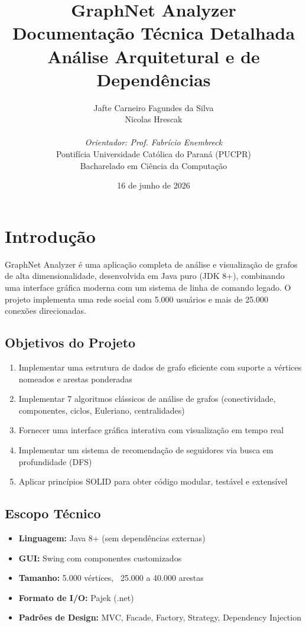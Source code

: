 \documentclass[12pt,a4paper]{article}
\title{\textbf{GraphNet Analyzer}\\
\large Documentação Técnica Detalhada\\
\normalsize Análise Arquitetural e de Dependências}
\author{
    Jafte Carneiro Fagundes da Silva\\
    Nicolas Hrescak\\
    \\
    \textit{Orientador: Prof. Fabrício Enembreck}\\
    Pontifícia Universidade Católica do Paraná (PUCPR)\\
    Bacharelado em Ciência da Computação
}
\date{16 de junho de 2026}
\begin{document}
\maketitle
\thispagestyle{empty}
\newpage

\tableofcontents
\newpage

\section{Introdução}

GraphNet Analyzer é uma aplicação completa de análise e visualização de grafos de alta dimensionalidade, desenvolvida em Java puro (JDK 8+), combinando uma interface gráfica moderna com um sistema de linha de comando legado. O projeto implementa uma rede social com 5.000 usuários e mais de 25.000 conexões direcionadas.

\subsection{Objetivos do Projeto}

\begin{enumerate}
    \item Implementar uma estrutura de dados de grafo eficiente com suporte a vértices nomeados e arestas ponderadas
    \item Implementar 7 algoritmos clássicos de análise de grafos (conectividade, componentes, ciclos, Euleriano, centralidades)
    \item Fornecer uma interface gráfica interativa com visualização em tempo real
    \item Implementar um sistema de recomendação de seguidores via busca em profundidade (DFS)
    \item Aplicar princípios SOLID para obter código modular, testável e extensível
\end{enumerate}

\subsection{Escopo Técnico}

\begin{itemize}
    \item \textbf{Linguagem:} Java 8+ (sem dependências externas)
    \item \textbf{GUI:} Swing com componentes customizados
    \item \textbf{Tamanho:} 5.000 vértices, ~25.000 a 40.000 arestas
    \item \textbf{Formato de I/O:} Pajek (.net)
    \item \textbf{Padrões de Design:} MVC, Facade, Factory, Strategy, Dependency Injection
\end{itemize}
\end{document}
